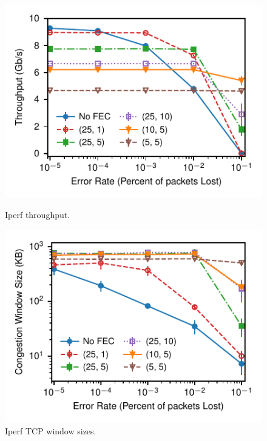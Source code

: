 \begin{figure}[!ht]
\centering
\begin{minipage}[b]{0.32\linewidth}
\includegraphics[width=\linewidth]{figures/lossVsTput.pdf}
\caption{Iperf throughput.}
\label{fig:lossVsTput}
\end{minipage}
\hspace{.05in}
\begin{minipage}[b]{0.32\linewidth}
\includegraphics[width=\textwidth]{figures/lossVsWindow.pdf}
\caption{Iperf TCP window sizes.}
\label{fig:lossVsWindow}
\end{minipage}
\hspace{.05in}
\begin{minipage}[b]{0.32\linewidth}

\end{minipage}
\end{figure}
